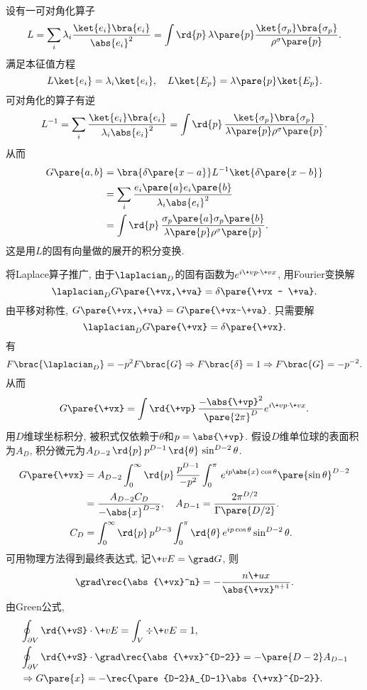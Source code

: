 \documentclass[hidelinks]{ctexart}
\begin{document}
\newpoint{}设有一可对角化算子
\[ L = \sum_i \lambda_i \frac{\ket{e_i}\bra{e_i}}{\abs{e_i}^2} = \int \rd{p}\, \lambda\pare{p} \frac{\ket{\sigma_p}\bra{\sigma_p}}{\rho^\sigma\pare{p}}. \]
满足本征值方程
\[ L\ket{e_i} = \lambda_i \ket{e_i},\quad L\ket{E_p} = \lambda\pare{p}\ket{E_p}. \]
\newpoint{}可对角化的算子有逆
\[ L^{-1} = \sum_i \frac{\ket{e_i}\bra{e_i}}{\lambda_i \abs{e_i}^2} = \int \rd{p}\,\frac{\ket{\sigma_p}\bra{\sigma_p}}{\lambda\pare{p}\rho^\sigma\pare{p}}. \]
从而
\begin{align*}
    G\pare{a,b} &= \bra{\delta\pare{x-a}}L^{-1}\ket{\delta\pare{x-b}} \\
    &= \sum_i \frac{e_i\pare{a}e_i\pare{b}}{\lambda_i\abs{e_i}^2} \\
    &= \int \rd{p}\, \frac{\sigma_p\pare{a}\sigma_p\pare{b}}{\lambda\pare{p}\rho^\sigma\pare{p}}.
\end{align*}
这是用$L$的固有向量做的展开的积分变换.
\begin{sample}
    \begin{ex}
        将Laplace算子推广, 由于$\laplacian_D$的固有函数为$e^{i\+vp\cdot \+vx}$, 用Fourier变换解
        \[ \laplacian_D G\pare{\+vx,\+va} = \delta\pare{\+vx - \+va}. \]
        由平移对称性, $G\pare{\+vx,\+va} = G\pare{\+vx-\+va}$. 只需要解
        \[ \laplacian_D G\pare{\+vx} = \delta\pare{\+vx}. \]
        有
        \[ F\brac{\laplacian_D} = -p^2 F\brac{G} \Rightarrow F\brac{\delta} = 1 \Rightarrow F\brac{G} = -p^{-2}. \]
        从而
        \[ G\pare{\+vx} = \int \rd{\+vp}\, \frac{-\abs{\+vp}^2}{\pare{2\pi}^D}e^{i\+vp\cdot \+vx}. \]
        用$D$维球坐标积分, 被积式仅依赖于$\theta$和$p = \abs{\+vp}$. 假设$D$维单位球的表面积为$A_D$, 积分微元为$A_{D-2} \,\rd{p}\, p^{D-1}\,\rd{\theta}\,\sin^{D-2}\theta$.
        \begin{align*}
            G\pare{\+vx} &= A_{D-2}\int_0^\infty \rd{p}\, \frac{p^{D-1}}{-p^2} \int_0^\pi\, e^{ip\abs{x}\cos\theta}\pare{\sin\theta}^{D-2} \\
            &= \frac{A_{D-2}C_D}{-\abs{x}^{D-2}},\quad A_{D-1} = \frac{2\pi^{D/2}}{\Gamma\pare{D/2}}. \\
            C_D &= \int_0^\infty \rd{p}\, p^{D-3}\int_0^\pi \rd{\theta}\, e^{ip\cos\theta}\sin^{D-2}\theta.
        \end{align*}
        可用物理方法得到最终表达式, 记$\+vE = \grad G$, 则
        \[ \grad \rec{\abs{\+vx}^n} = -\frac{n\+ux}{\abs{\+vx}^{n+1}}. \]
        由Green公式,
        \begin{align*}
            & \oint_{\partial V} \rd{\+vS}\cdot \+vE = \int_V \div \+vE = 1, \\
            & \oint_{\partial V} \rd{\+vS} \cdot \grad \rec{\abs{\+vx}^{D-2}} = -\pare{D-2}A_{D-1} \\
            & \Rightarrow G\pare{x} = -\rec{\pare{D-2}A_{D-1}\abs{\+vx}^{D-2}}.
        \end{align*}
    \end{ex}
\end{sample}
\end{document}
